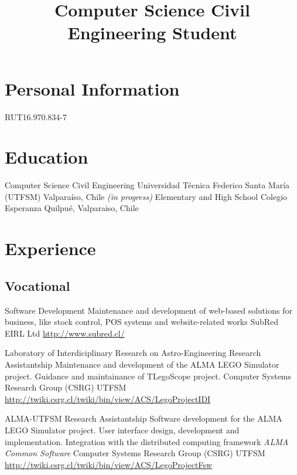\documentclass[11pt,a4paper]{moderncv}
\title{Computer Science Civil Engineering Student}
\begin{document}
\maketitle

\section{Personal Information}
\vspace{-0.2cm}
	   {RUT}{16.970.834-7}
\vspace{-0.2cm}
	   {}{}
	   
\section{Education}

        {Computer Science Civil Engineering}
        {Universidad Técnica Federico Santa María (UTFSM)}
        {Valparaíso, Chile}
        {\emph{(in progress)}}
        {}
        {Elementary and High School}
        {Colegio Esperanza}
        {Quilpué, Valparaiso, Chile}
        {}{}

\section{Experience}
\subsection{Vocational}
        
        {Software Development}
        {Maintenance and development of web-based solutions for business, like stock control, POS systems and website-related works}
        {SubRed EIRL Ltd}
        {}
        {\url{http://www.subred.cl/}}

        {Laboratory of Interdiciplinary Research on Astro-Engineering Research Assistantship}
        {Maintenance and development of the ALMA LEGO Simulator project. Guidance and maintainance of TLegoScope project.}
        {Computer Systems Research Group (CSRG)}
        {UTFSM}
        {\url{http://twiki.csrg.cl/twiki/bin/view/ACS/LegoProjectIDI}}

        {ALMA-UTFSM Research Assistantship}
        {Software development for the ALMA LEGO Simulator project. User interface design, development and implementation. Integration with the distributed computing framework \emph{ALMA Common Software}}
        {Computer Systems Research Group (CSRG)}
        {UTFSM}
        {\url{http://twiki.csrg.cl/twiki/bin/view/ACS/LegoProjectFsw}}
        
\end{document}
